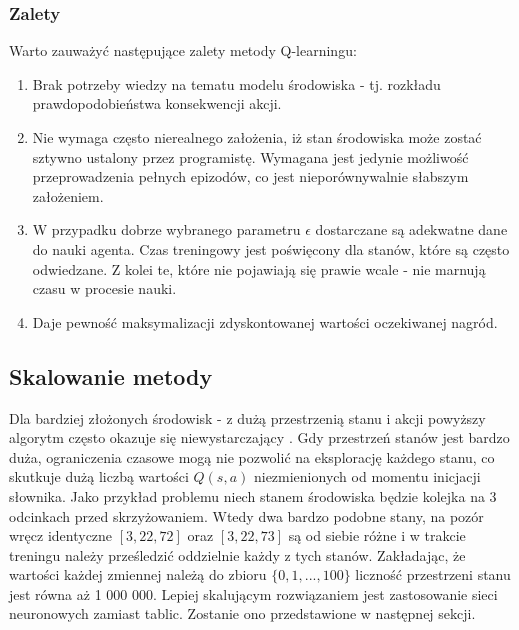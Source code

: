 \documentclass[12pt]{book}
\theoremstyle{plain}
\begin{document}
\subsubsection{Zalety} 
Warto zauważyć następujące zalety metody Q-learningu:
\begin{enumerate}
	\item Brak potrzeby wiedzy na tematu modelu środowiska - tj. rozkładu prawdopodobieństwa konsekwencji akcji.
	\item Nie wymaga często nierealnego założenia, iż stan środowiska może zostać sztywno ustalony przez programistę. Wymagana jest jedynie możliwość przeprowadzenia pełnych epizodów, co jest nieporównywalnie słabszym założeniem.
	\item W przypadku dobrze wybranego parametru $\epsilon$ dostarczane są adekwatne dane do nauki agenta. Czas treningowy jest poświęcony dla stanów, które są często odwiedzane. Z kolei te, które nie pojawiają się prawie wcale - nie marnują czasu w procesie nauki.
	\item Daje pewność maksymalizacji zdyskontowanej wartości oczekiwanej nagród.
\end{enumerate}
\subsection*{Skalowanie metody}
Dla bardziej złożonych środowisk - z dużą przestrzenią stanu i akcji powyższy algorytm często okazuje się niewystarczający \cite{q_zlozony_env}. Gdy przestrzeń stanów jest bardzo duża, ograniczenia czasowe mogą nie pozwolić na eksplorację każdego stanu, co skutkuje dużą liczbą wartości $Q(s,a)$ niezmienionych od momentu inicjacji słownika. Jako przykład problemu niech stanem środowiska będzie kolejka na 3 odcinkach przed skrzyżowaniem. Wtedy dwa bardzo podobne stany, na pozór wręcz identyczne $[3,22,72]$ oraz $[3,22,73]$ są od siebie różne i w trakcie treningu należy prześledzić oddzielnie każdy z tych stanów. Zakładając, że wartości każdej zmiennej należą do zbioru $\{0,1,...,100\}$ liczność przestrzeni stanu jest równa aż 1 000 000. Lepiej skalującym rozwiązaniem jest zastosowanie sieci neuronowych zamiast tablic. Zostanie ono przedstawione w następnej sekcji.
\end{document}
